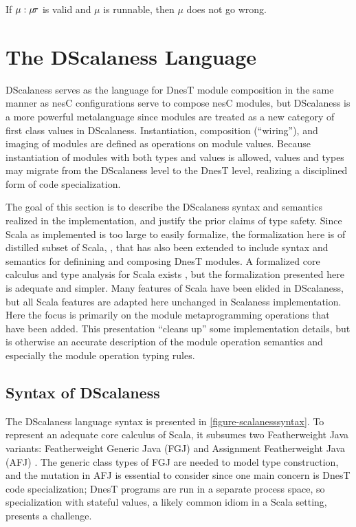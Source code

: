 \begin{conject}
  If $\mu : \mu\!\tau$ is valid and $\mu$ is runnable, then $\mu$ does not go wrong.
\end{conject}

\declmodtypingfig

\section{The DScalaness Language}
\label{section-dscalaness-theory}

DScalaness serves as the language for DnesT module composition in the same manner as nesC
configurations serve to compose nesC modules, but DScalaness is a more powerful metalanguage
since modules are treated as a new category of first class values in DScalaness. Instantiation,
composition (``wiring''), and imaging of modules are defined as operations on module values.
Because instantiation of modules with both types and values is allowed, values and types may
migrate from the DScalaness level to the DnesT level, realizing a disciplined form of code
specialization.

The goal of this section is to describe the DScalaness syntax and semantics realized in the
implementation, and justify the prior claims of type safety. Since Scala as implemented is too
large to easily formalize, the formalization here is of distilled subset of Scala,
, that has also been extended to include syntax and semantics for definining
and composing DnesT modules. A formalized core calculus and type analysis for Scala exists
\cite{Cremet:2006:CCS:2135978.2135980}, but the formalization presented here is adequate and
simpler. Many features of Scala have been elided in DScalaness, but all Scala features are
adapted here unchanged in Scalaness
implementation. Here the focus is primarily on the module metaprogramming operations that have
been added. This presentation ``cleans up'' some implementation details, but is otherwise an
accurate description of the module operation semantics and especially the module operation
typing rules.

\subsection{Syntax of DScalaness}
\label{section-dscalaness-syntax}

\scalanesssyntaxfig

The DScalaness language syntax is presented in \autoref{figure-scalanesssyntax}. To represent an
adequate core calculus of Scala, it subsumes two Featherweight Java variants: Featherweight
Generic Java (FGJ) \cite{FJ} and Assignment Featherweight Java (AFJ) \cite{AFJ}. The generic
class types of FGJ are needed to model type construction, and the mutation in AFJ is essential
to consider since one main concern is DnesT code specialization; DnesT programs are run
in a separate process space, so specialization with stateful values, a likely common idiom in a
Scala setting, presents a challenge.

